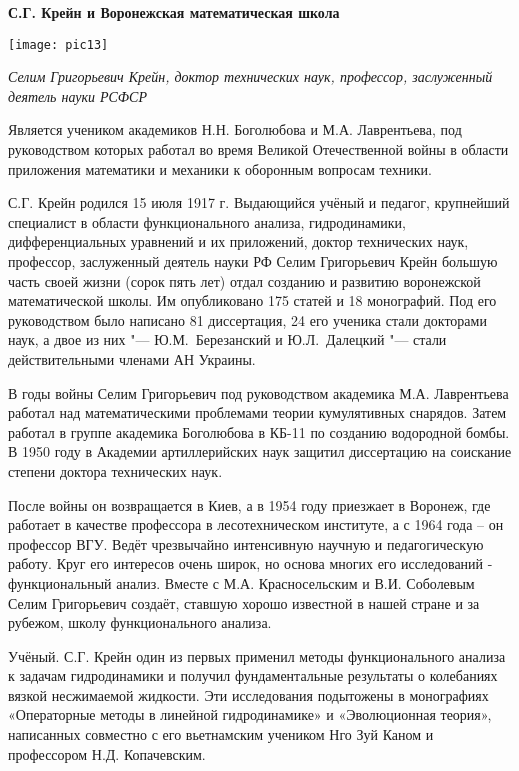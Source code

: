 \begin{center}
{\bf С.Г. Крейн и Воронежская математическая школа}

\vspace{3mm}

\texttt{[image: pic13]}


{\it Селим Григорьевич Крейн, доктор технических наук,
 профессор, заслуженный деятель науки РСФСР}
\end{center}

Является учеником академиков Н.Н. Боголюбова и М.А. Лаврентьева, под руководством которых работал во время Великой Отечественной войны в области приложения математики и механики к оборонным вопросам техники.

С.Г. Крейн родился 15 июля 1917 г. Выдающийся учёный и педагог, крупнейший специалист в области функционального анализа, гидродинамики, дифференциальных уравнений и их приложений, доктор технических наук, профессор, заслуженный деятель науки РФ Селим Григорьевич Крейн большую часть своей жизни (сорок пять лет) отдал созданию и развитию воронежской математической школы. Им опубликовано 175 статей и 18 монографий. Под его руководством было написано 81 диссертация, 24 его ученика стали докторами наук, а двое из них "--- Ю.М.~Березанский и Ю.Л.~Далецкий "--- стали действительными членами АН Украины.

В годы войны Селим Григорьевич под руководством академика М.А. Лаврентьева работал над математическими проблемами теории кумулятивных снарядов. Затем работал в группе академика Боголюбова в КБ-11 по созданию водородной бомбы. В 1950 году в Академии артиллерийских наук защитил диссертацию на соискание степени доктора технических наук.

После войны он возвращается в Киев, а в 1954 году приезжает в Воронеж, где работает в качестве профессора в лесотехническом институте, а с 1964 года – он профессор ВГУ. Ведёт чрезвычайно интенсивную научную и педагогическую работу. Круг его интересов очень широк, но основа многих его исследований - функциональный анализ. Вместе с М.А. Красносельским и В.И. Соболевым Селим Григорьевич создаёт, ставшую хорошо известной в нашей стране и за рубежом, школу функционального анализа.

Учёный. С.Г. Крейн один из первых применил методы функционального анализа к задачам гидродинамики и получил фундаментальные результаты о колебаниях вязкой несжимаемой жидкости. Эти исследования подытожены в монографиях «Операторные методы в линейной гидродинамике» и «Эволюционная теория», написанных совместно с его вьетнамским учеником Нго Зуй Каном и профессором Н.Д. Копачевским.

